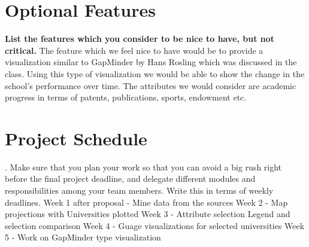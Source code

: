\documentclass[11pt, a4paper]{article}
\begin{document}
\section{Optional Features}\textbf{ List the features which you consider to be nice to have, but not critical.}
The feature which we feel nice to have would be to provide a visualization similar to GapMinder by Hans Rosling which was discussed in the class. Using this type of visualization we would be able to show the change in the school's performance over time.
The attributes we would consider are academic progress in terms of patents, publications, sports, endowment etc.


\section{Project Schedule}{. Make sure that you plan your work so that you can avoid a big rush right before the final project deadline, and delegate different modules and responsibilities among your team members. Write this in terms of weekly deadlines.}
Week 1 after proposal - Mine data from the sources
Week 2 - Map projections with Universities plotted
Week 3 -  Attribute selection Legend and selection comparison
Week 4 - Guage visualizations for selected universities
Week 5 - Work on GapMinder type visualization
\end{document}
